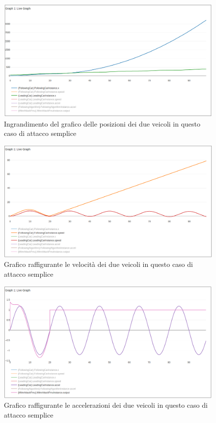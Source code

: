 \begin{figure}[H]
	\centering
	\includegraphics[width=\textwidth]{img/AttackAccel1X.png}
	\caption{Ingrandimento del grafico delle posizioni dei due veicoli in questo caso di attacco semplice}
\end{figure}

\begin{figure}[H]
	\centering
	\includegraphics[width=\textwidth]{img/AttackAccel1Speed.png}
	\caption{Grafico raffigurante le velocità dei due veicoli in questo caso di attacco semplice}
\end{figure}

\begin{figure}[H]
	\centering
	\includegraphics[width=\textwidth]{img/AttackAccel1Accel.png}
	\caption{Grafico raffigurante le accelerazioni dei due veicoli in questo caso di attacco semplice}
\end{figure}


